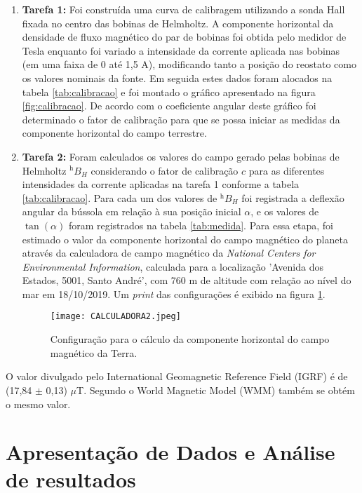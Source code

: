 \documentclass[reprint,amsmath,amssymb,aps]{revtex4-2}
\begin{document}
\begin{enumerate}
    \item \textbf{Tarefa 1:} Foi construída uma curva de calibragem utilizando a sonda Hall fixada no centro das bobinas de Helmholtz. A componente horizontal da densidade de fluxo magnético do par de bobinas foi obtida pelo medidor de Tesla enquanto foi variado a intensidade da corrente aplicada nas
    bobinas (em uma faixa de 0 até 1,5 A), modificando tanto a posição do reostato como os valores nominais da fonte. Em seguida estes dados foram alocados na tabela \ref{tab:calibracao} e foi montado o gráfico apresentado na figura \ref{fig:calibracao}. De acordo com o coeficiente angular deste gráfico foi determinado o fator de calibração para que se possa iniciar as medidas da componente horizontal do campo terrestre.
    \item \textbf{Tarefa 2:} Foram calculados os valores do campo gerado pelas bobinas de Helmholtz $^\text{h}B_H$ considerando o fator de calibração $c$ para as diferentes intensidades da corrente aplicadas na tarefa 1 conforme a tabela \ref{tab:calibracao}. Para cada um dos valores de $^\text{h}B_H$ foi registrada a deflexão angular da bússola em relação à sua posição inicial $\alpha$, e os valores de $\tan(\alpha)$ foram registrados na tabela \ref{tab:medida}. Para essa etapa, foi estimado o valor da componente horizontal do campo magnético do planeta através da calculadora de campo magnético da \textit{National Centers for Environmental Information}\cite{efieldcalc}, calculada para a localização 'Avenida dos Estados, 5001, Santo André', com 760 m de altitude com relação ao nível do mar em 18/10/2019. Um \textit{print} das configurações é exibido na figura \ref{fig:efieldcalc}.
    \begin{figure}[H]
        \centering
        \texttt{[image: CALCULADORA2.jpeg]}
        \caption{Configuração para o cálculo da componente horizontal do campo magnético da Terra.}
        \label{fig:efieldcalc}
    \end{figure}
  
\end{enumerate}
 O valor divulgado pelo International Geomagnetic Reference Field (IGRF) é de (17,84 $\pm$ 0,13) $\mu$T. Segundo o  World Magnetic Model (WMM) também se obtém o mesmo valor.
 
\section{Apresentação de Dados e Análise de resultados}
\end{document}

